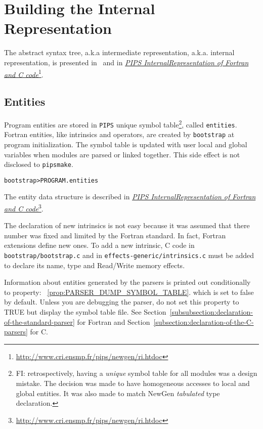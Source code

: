 \documentclass[a4paper]{report}
\newenvironment{PipsMake}{\begin{alltt}}{\end{alltt}}
\newcommand{\PipsPropRef}[1]{\texttt{\detokenize{#1}}~\ref{prop:#1}}
\newcommand{\LINK}[2]{\href{#2}{#1}\footnote{\url{#2}}\xspace}
\newcommand{\Pips}{\texttt{PIPS}}
\newcommand{\Pipsmake}{\texttt{pipsmake}}
\newcommand{\Pri}{\LINK{\emph{PIPS Internal\space{}Representation of
      Fortran and C code}}{http://www.cri.ensmp.fr/pips/newgen/ri.htdoc}}
\begin{document}

\chapter{Building the Internal Representation}
\label{section-abstract-syntax-tree}

The abstract syntax tree, a.k.a intermediate representation,
a.k.a. internal representation, is presented in~\cite{IJT92} and in \Pri{}.

\section{Entities}
\label{subsubsection-entities}

Program entities are stored in \Pips{} unique symbol table\footnote{FI:
retrospectively, having a {\em unique} symbol table for all modules was
a design mistake. The decision was made to have homogeneous accesses to
local and global entities. It was also made to match NewGen {\em
tabulated} type declaration.}, called \verb+entities+. Fortran entities,
like intrinsics and operators, are created by \verb+bootstrap+ at
program initialization. The symbol table is updated with user local and
global variables when modules are parsed or linked together. This side
effect is not disclosed to \Pipsmake{}.

\begin{PipsMake}
bootstrap                       > PROGRAM.entities
\end{PipsMake}

The entity data structure is described in \Pri{}.

The declaration of new intrinsics is not easy because it was assumed that
there number was fixed and limited by the Fortran standard. In fact,
Fortran extensions define new ones. To add a new intrinsic, C code in
\texttt{bootstrap/bootstrap.c} and in \texttt{effects-generic/intrinsics.c}
must be added to declare its name, type and Read/Write memory effects.

Information about entities generated by the parsers is printed out
conditionally to property: \PipsPropRef{PARSER_DUMP_SYMBOL_TABLE}.
which is set to false by default. Unless you are debugging the parser,
do not set this property to TRUE but display the symbol table file. See Section~\ref{subsubsection:declaration-of-the-standard-parser}
for Fortran and Section~\ref{subsection:declaration-of-the-C-parsers}
for C.
\end{document}
